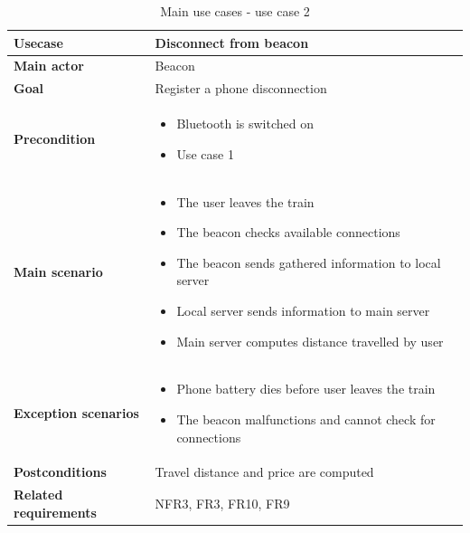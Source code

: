 \begin{table}[H]
	\centering
	\begin{tabularx}{\linewidth}{l|X}
		\textbf{Usecase}      &  Disconnect from beacon\\ \hline
		\textbf{Main actor}  & Beacon \\\hline
		\textbf{Goal}   &  Register a phone disconnection \\ \hline
		\textbf{Precondition}     &  \begin{itemize}
			\item Bluetooth is switched on
			\item Use case 1
		\end{itemize}\\ \hline
		\textbf{Main scenario}    &  \begin{itemize}
			\item The user leaves the train
			\item The beacon checks available connections
			\item The beacon sends gathered information to local server
			\item Local server sends information to main server
			\item Main server computes distance travelled by user
		\end{itemize}\\ \hline
		\textbf{Exception scenarios} & \begin{itemize}
			\item Phone battery dies before user leaves the train
			\item The beacon malfunctions and cannot check for connections
		\end{itemize}\\ \hline
		\textbf{Postconditions} & Travel distance and price are computed\\ \hline
		\textbf{Related requirements} & NFR3, FR3, FR10, FR9 \\ \hline
	\end{tabularx}
	\caption{Main use cases - use case 2}
	\label{tbl:uc2}
\end{table}

